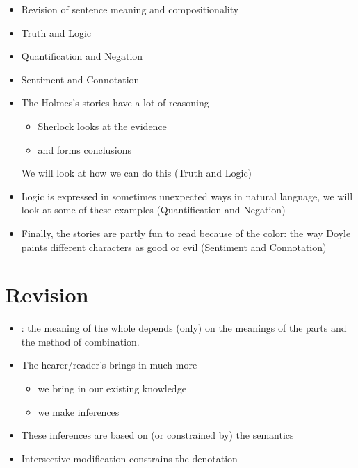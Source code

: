 \documentclass[a4paper,landscape,headrule,footrule,xetex]{foils}
\begin{document}
\maketitle

%



\begin{itemize}
\item Revision of sentence meaning and compositionality
\item Truth and Logic
\item Quantification and Negation
\item Sentiment and Connotation
\end{itemize}




\begin{itemize}
\item The Holmes's stories have a lot of reasoning
  \begin{itemize}
  \item Sherlock looks at the evidence
  \item and forms conclusions
  \end{itemize}
  We will look at how we can do this (Truth and Logic)
\item Logic is expressed in sometimes unexpected ways in natural
  language, we will look at some of these examples (Quantification and Negation)
\item Finally, the stories are partly fun to read because of the
  color: the way Doyle paints different characters as good or evil
  (Sentiment and Connotation)
\end{itemize}


\section{Revision}


\begin{itemize}
\item {}: the meaning of the whole depends (only)
  on the meanings of the parts and the method of combination.
\item The hearer/reader's  brings in much more
  \begin{itemize}
  \item we bring in our existing knowledge
  \item we make inferences
  \end{itemize}
\item These inferences are based on (or constrained by) the semantics
\item Intersective modification constrains the denotation
\end{itemize}
\end{document}
